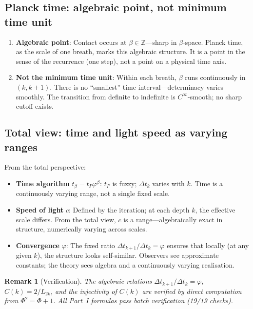 \documentclass[12pt,a4paper]{article}
\newtheorem{remark}[theorem]{Remark}
\begin{document}
\subsection{Planck time: algebraic point, not minimum time unit}

\begin{enumerate}[nosep]
\item \textbf{Algebraic point}: Contact occurs at $\beta \in \mathbb{Z}$---sharp in $\beta$-space. Planck time, as the scale of one breath, marks this algebraic structure. It is a point in the sense of the recurrence (one step), not a point on a physical time axis.
\item \textbf{Not the minimum time unit}: Within each breath, $\beta$ runs continuously in $(k, k+1)$. There is no ``smallest'' time interval---determinacy varies smoothly. The transition from definite to indefinite is $C^\infty$-smooth; no sharp cutoff exists.
\end{enumerate}

\subsection{Total view: time and light speed as varying ranges}

From the total perspective:
\begin{itemize}[nosep]
\item \textbf{Time algorithm} $t_\beta = t_P\varphi^\beta$: $t_P$ is fuzzy; $\Delta t_k$ varies with $k$. Time is a continuously varying range, not a single fixed scale.
\item \textbf{Speed of light} $c$: Defined by the iteration; at each depth $k$, the effective scale differs. From the total view, $c$ is a range---algebraically exact in structure, numerically varying across scales.
\item \textbf{Convergence} $\varphi$: The fixed ratio $\Delta t_{k+1}/\Delta t_k = \varphi$ ensures that locally (at any given $k$), the structure looks self-similar. Observers see approximate constants; the theory sees algebra and a continuously varying realisation.
\end{itemize}

\begin{remark}[Verification]
The algebraic relations $\Delta t_{k+1}/\Delta t_k = \varphi$, $C(k) = 2/L_{2k}$, and the injectivity of $C(k)$ are verified by direct computation from $\Phi^2 = \Phi + 1$. All Part~I formulas pass batch verification (19/19 checks).
\end{remark}
\end{document}
